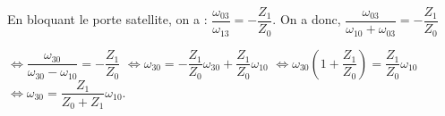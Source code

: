 \begin{corrigebox}
En bloquant le porte satellite, on a : $\dfrac{\omega_{03}}{\omega_{13}}=-\dfrac{Z_1}{Z_0}$. On a donc, 
$\dfrac{\omega_{03}}{\omega_{10}+\omega_{03}}=-\dfrac{Z_1}{Z_0}$

$\Leftrightarrow \dfrac{\omega_{30}}{\omega_{30}-\omega_{10}}=-\dfrac{Z_1}{Z_0}$
$\Leftrightarrow \omega_{30}=-\dfrac{Z_1}{Z_0} \omega_{30}+\dfrac{Z_1}{Z_0}\omega_{10} $
$\Leftrightarrow \omega_{30}\left( 1+\dfrac{Z_1}{Z_0} \right)=\dfrac{Z_1}{Z_0}\omega_{10} $
$\Leftrightarrow \omega_{30}=\dfrac{Z_1}{Z_0+Z_1}\omega_{10} $.
\end{corrigebox}
